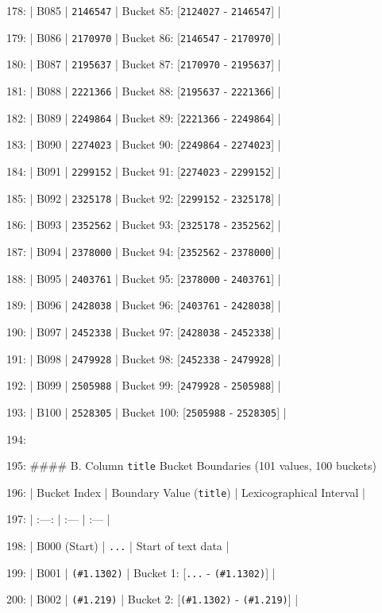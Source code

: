\documentclass[11pt,a4paper]{article}
\begin{document}
{{{178: | B085 | \texttt{2146547} | Bucket 85: [\texttt{2124027} - \texttt{2146547}] |

179: | B086 | \texttt{2170970} | Bucket 86: [\texttt{2146547} - \texttt{2170970}] |

180: | B087 | \texttt{2195637} | Bucket 87: [\texttt{2170970} - \texttt{2195637}] |

181: | B088 | \texttt{2221366} | Bucket 88: [\texttt{2195637} - \texttt{2221366}] |

182: | B089 | \texttt{2249864} | Bucket 89: [\texttt{2221366} - \texttt{2249864}] |

183: | B090 | \texttt{2274023} | Bucket 90: [\texttt{2249864} - \texttt{2274023}] |

184: | B091 | \texttt{2299152} | Bucket 91: [\texttt{2274023} - \texttt{2299152}] |

185: | B092 | \texttt{2325178} | Bucket 92: [\texttt{2299152} - \texttt{2325178}] |

186: | B093 | \texttt{2352562} | Bucket 93: [\texttt{2325178} - \texttt{2352562}] |

187: | B094 | \texttt{2378000} | Bucket 94: [\texttt{2352562} - \texttt{2378000}] |

188: | B095 | \texttt{2403761} | Bucket 95: [\texttt{2378000} - \texttt{2403761}] |

189: | B096 | \texttt{2428038} | Bucket 96: [\texttt{2403761} - \texttt{2428038}] |

190: | B097 | \texttt{2452338} | Bucket 97: [\texttt{2428038} - \texttt{2452338}] |

191: | B098 | \texttt{2479928} | Bucket 98: [\texttt{2452338} - \texttt{2479928}] |

192: | B099 | \texttt{2505988} | Bucket 99: [\texttt{2479928} - \texttt{2505988}] |

193: | B100 | \texttt{2528305} | Bucket 100: [\texttt{2505988} - \texttt{2528305}] |

194:

195: \#\#\#\# B. Column \texttt{title} Bucket Boundaries (101 values, 100 buckets)

196: | Bucket Index | Boundary Value (\texttt{title}) | Lexicographical Interval |

197: | :---: | :--- | :--- |

198: | B000 (Start) | \texttt{...} | Start of text data |

199: | B001 | \texttt{(\#1.1302)} | Bucket 1: [\texttt{...} - \texttt{(\#1.1302)}] |

200: | B002 | \texttt{(\#1.219)} | Bucket 2: [\texttt{(\#1.1302)} - \texttt{(\#1.219)}] |

}}}
\end{document}

